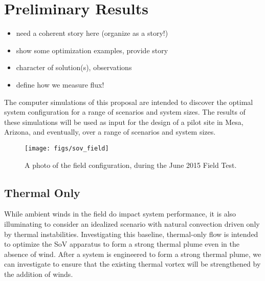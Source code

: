  
\section{Preliminary Results}
\label{sec:results}

\begin{itemize}
\item need a coherent story here (organize as a story!)
\item show some optimization examples, provide story
\item character of solution(s), observations
\item define how we measure flux!
\end{itemize}



The computer simulations of this proposal are intended to discover the
optimal system configuration for a range of scenarios and system
sizes. The results of these simulations will be used as input for the
design of a pilot site in Mesa, Arizona, and eventually, over a range of
scenarios and system sizes. 

  \begin{figure}[!htb]
   \begin{center}
    \texttt{[image: figs/sov\_field]}
    \caption{A photo of the field configuration, during the June 2015
    Field Test.}
    \label{fig:field_real}
   \end{center}
  \end{figure}


\subsection{Thermal Only}

While ambient winds in the field do impact system performance, it is
also illuminating to consider an idealized scenario with natural convection
driven only by thermal instabilities. Investigating this baseline,
thermal-only flow is intended to optimize the SoV apparatus to form a
strong thermal plume even in the absence of wind. After a system is
engineered to form a strong thermal plume, we can investigate to ensure
that the existing thermal vortex will be strengthened by the addition of
winds. 



